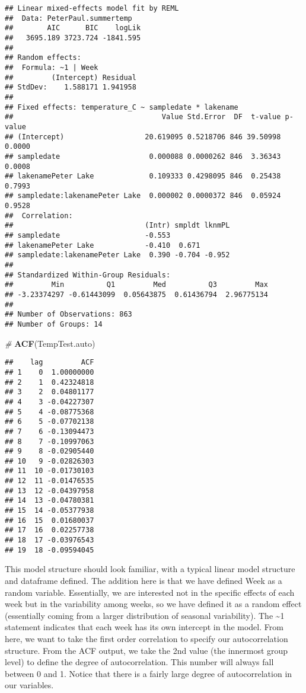 \documentclass[]{article}
\newenvironment{Shaded}{\begin{snugshade}}{\end{snugshade}}
\newcommand{\KeywordTok}[1]{\textcolor[rgb]{0.13,0.29,0.53}{\textbf{#1}}}
\newcommand{\CommentTok}[1]{\textcolor[rgb]{0.56,0.35,0.01}{\textit{#1}}}
\newcommand{\NormalTok}[1]{#1}
\begin{document}
\begin{verbatim}
## Linear mixed-effects model fit by REML
##  Data: PeterPaul.summertemp 
##        AIC      BIC    logLik
##   3695.189 3723.724 -1841.595
## 
## Random effects:
##  Formula: ~1 | Week
##         (Intercept) Residual
## StdDev:    1.588171 1.941958
## 
## Fixed effects: temperature_C ~ sampledate * lakename 
##                                   Value Std.Error  DF  t-value p-value
## (Intercept)                   20.619095 0.5218706 846 39.50998  0.0000
## sampledate                     0.000088 0.0000262 846  3.36343  0.0008
## lakenamePeter Lake             0.109333 0.4298095 846  0.25438  0.7993
## sampledate:lakenamePeter Lake  0.000002 0.0000372 846  0.05924  0.9528
##  Correlation: 
##                               (Intr) smpldt lknmPL
## sampledate                    -0.553              
## lakenamePeter Lake            -0.410  0.671       
## sampledate:lakenamePeter Lake  0.390 -0.704 -0.952
## 
## Standardized Within-Group Residuals:
##         Min          Q1         Med          Q3         Max 
## -3.23374297 -0.61443099  0.05643875  0.61436794  2.96775134 
## 
## Number of Observations: 863
## Number of Groups: 14
\end{verbatim}

\begin{Shaded}
\begin{Highlighting}[]
\CommentTok{# }
\KeywordTok{ACF}\NormalTok{(TempTest.auto)}
\end{Highlighting}
\end{Shaded}

\begin{verbatim}
##    lag         ACF
## 1    0  1.00000000
## 2    1  0.42324818
## 3    2  0.04801177
## 4    3 -0.04227307
## 5    4 -0.08775368
## 6    5 -0.07702138
## 7    6 -0.13094473
## 8    7 -0.10997063
## 9    8 -0.02905440
## 10   9 -0.02826303
## 11  10 -0.01730103
## 12  11 -0.01476535
## 13  12 -0.04397958
## 14  13 -0.04780381
## 15  14 -0.05377938
## 16  15  0.01680037
## 17  16  0.02257738
## 18  17 -0.03976543
## 19  18 -0.09594045
\end{verbatim}

\begin{Shaded}
\end{Shaded}

This model structure should look familiar, with a typical linear model
structure and dataframe defined. The addition here is that we have
defined Week as a random variable. Essentially, we are interested not in
the specific effects of each week but in the variability among weeks, so
we have defined it as a random effect (essentially coming from a larger
distribution of seasonal variability). The \textasciitilde{}1 statement
indicates that each week has its own intercept in the model. From here,
we want to take the first order correlation to specify our
autocorrelation structure. From the ACF output, we take the 2nd value
(the innermost group level) to define the degree of autocorrelation.
This number will always fall between 0 and 1. Notice that there is a
fairly large degree of autocorrelation in our variables.
\end{document}
